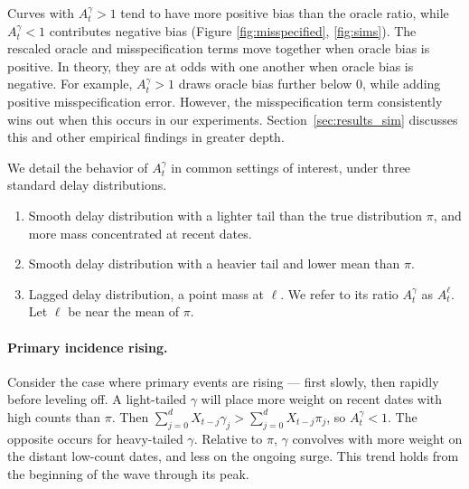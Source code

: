 \documentclass{article}
\begin{document}
Curves with $A_t^\gamma>1$ tend to have more positive bias than the oracle ratio, while $A_t^\gamma<1$ contributes negative bias (Figure \ref{fig:misspecified}, \ref{fig:sims}). 
The rescaled oracle and misspecification terms move together when oracle bias is positive. 
In theory, they are at odds with one another when oracle bias is negative. For example, $A_t^\gamma>1$ draws oracle bias further below 0, while adding positive misspecification error. 
However, the misspecification term consistently wins out when this occurs in our experiments. Section~\ref{sec:results_sim} discusses this and other empirical findings in greater depth.


We detail the behavior of $A_t^\gamma$ in common settings of interest, under three standard delay distributions.
\begin{enumerate}
    \item Smooth delay distribution with a lighter tail than the true distribution $\pi$, and more mass concentrated at recent dates.
    \item Smooth delay distribution with a heavier tail and lower mean than $\pi$. 
    \item Lagged delay distribution, a point mass at $\ell$. We refer to its ratio $A_t^\gamma$ as $A_t^\ell$.  Let $\ell$ be near the mean of $\pi$.
\end{enumerate}

\paragraph{Primary incidence rising.} 
Consider the case where primary events are rising --- first slowly, then rapidly before leveling off. A light-tailed $\gamma$ will place more weight on recent dates with high counts than $\pi$. Then $\sum_{j=0}^d X_{t-j}\gamma_j > \sum_{j=0}^d X_{t-j}\pi_j$, so $A_t^\gamma < 1$. The opposite occurs for heavy-tailed $\gamma$. Relative to $\pi$, $\gamma$ convolves with more weight on the distant low-count dates, and less on the ongoing surge. This trend holds from the beginning of the wave through its peak.
\end{document}
